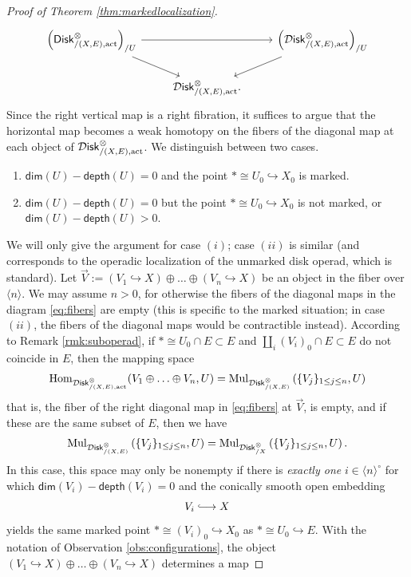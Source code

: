 \documentclass[10pt, reqno, twoside
, final
]{amsart}
\numberwithin{equation}{subsection}%
\theoremstyle{definition}
\theoremstyle{definition}
\theoremstyle{definition}
\theoremstyle{definition}
\theoremstyle{definition}
\theoremstyle{definition}
\theoremstyle{definition}
\theoremstyle{definition}
\theoremstyle{definition}
\theoremstyle{plain}
\theoremstyle{definition}
\theoremstyle{plain}
\theoremstyle{definition}
\theoremstyle{plain}
\theoremstyle{definition}
\theoremstyle{definition}
\theoremstyle{plain}
\theoremstyle{plain}
\theoremstyle{definition}
\theoremstyle{plain}
\theoremstyle{plain}
\theoremstyle{plain}
\begin{document}
\begin{proof}[Proof of Theorem \ref{thm:markedlocalization}]
\begin{equation}\label{eq:fibers}
\begin{tikzcd}
  \left(\disk_{/(X,E),\mathrm{act}}^{\otimes}\right)_{/U}  \ar[dr] \ar[rr] &&   \left(\infdisk_{/(X,E),\mathrm{act}}^{\otimes}\right)_{/U} \ar[dl] \\
  & \infdisk_{/(X,E),\mathrm{act}}^{\otimes}.
\end{tikzcd}    
\end{equation}
Since the right vertical map is a right fibration, it suffices to argue that the horizontal map becomes a weak homotopy on the fibers of the diagonal map at each object of $ \mathcal{D}\mathsf{isk}_{/(X,E),\mathrm{act}}^{\otimes}$. We distinguish between two cases.
\begin{enumerate}[$(i)$]
    \item $\mathsf{dim}(U)-\mathsf{depth}(U)=0$ and the point $*\cong U_0\hookrightarrow X_0$ is marked. 
    \item $\mathsf{dim}(U)-\mathsf{depth}(U)=0$ but the point $*\cong U_0\hookrightarrow X_0$ is not marked, or $\mathsf{dim}(U)-\mathsf{depth}(U)>0$.
\end{enumerate}
We will only give the argument for case $(i)$; case $(ii)$ is similar (and corresponds to the operadic localization of the unmarked disk operad, which is standard). Let $\vec{V}:=(V_1\hookrightarrow X)\oplus\ldots\oplus (V_n\hookrightarrow X)$ be an object in the fiber over $\langle n\rangle$. We may assume $n>0$, for otherwise the fibers of the diagonal maps in the diagram \eqref{eq:fibers} are empty (this is specific to the marked situation; in case $(ii)$, the fibers of the diagonal maps would be contractible instead). According to Remark \ref{rmk:suboperad}, if $*\cong U_0\cap E\subset E$ and $\coprod_{i}(V_i)_0 \cap E\subset E$ do not coincide in $E$, then the mapping space
\[\mathrm{Hom}_{\mathcal{D}\mathsf{isk}_{/(X,E),\mathrm{act}}^{\otimes} }(V_1\oplus \ldots\oplus V_n,U)=\mathrm{Mul}_{\mathcal{D}\mathsf{isk}_{/(X,E)}^{\otimes}}\left(\{V_j\}_{1\leq j\leq n},U\right)\]
that is, the fiber of the right diagonal map in \eqref{eq:fibers} at $\vec{V}$, is empty, and if these are the same subset of $E$, then we have 
\[\mathrm{Mul}_{\mathcal{D}\mathsf{isk}_{/(X,E)}^{\otimes}}\left(\{V_j\}_{1\leq j\leq n},U\right) = \mathrm{Mul}_{\mathcal{D}\mathsf{isk}_{/X}^{\otimes}}\left(\{V_j\}_{1\leq j\leq n},U\right).\]
In this case, this space may only be nonempty if there is \emph{exactly one} $i\in \langle n\rangle^{\circ}$ for which $\mathsf{dim}(V_i)-\mathsf{depth}(V_i)=0$ and the conically smooth open embedding
\[ V_i\hooklongrightarrow X \]
yields the same marked point $*\cong (V_i)_0\hookrightarrow X_0$ as $*\cong U_0\hookrightarrow E$. With the notation of Observation \ref{obs:configurations}, the object $(V_1\hookrightarrow X)\oplus\ldots\oplus (V_n\hookrightarrow X)$ determines a map 

\end{proof}
\end{document}
